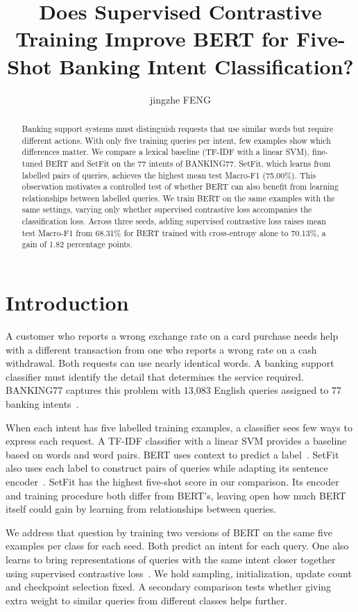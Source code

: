 \documentclass[runningheads]{llncs}
\title{Does Supervised Contrastive Training Improve BERT for Five-Shot Banking Intent Classification?}
\author{jingzhe FENG}
\institute{City University of Hong Kong (Dongguan)\\Student ID: 72655564}
\begin{document}
\maketitle
\begin{abstract}
Banking support systems must distinguish requests that use similar words but require different actions. With only five training queries per intent, few examples show which differences matter. We compare a lexical baseline (TF-IDF with a linear SVM), fine-tuned BERT and SetFit on the 77 intents of BANKING77. SetFit, which learns from labelled pairs of queries, achieves the highest mean test Macro-F1 (75.00\%). This observation motivates a controlled test of whether BERT can also benefit from learning relationships between labelled queries. We train BERT on the same examples with the same settings, varying only whether supervised contrastive loss accompanies the classification loss. Across three seeds, adding supervised contrastive loss raises mean test Macro-F1 from 68.31\% for BERT trained with cross-entropy alone to 70.13\%, a gain of 1.82 percentage points.
\end{abstract}

\section{Introduction}
A customer who reports a wrong exchange rate on a card purchase needs help with a different transaction from one who reports a wrong rate on a cash withdrawal. Both requests can use nearly identical words. A banking support classifier must identify the detail that determines the service required. BANKING77 captures this problem with 13,083 English queries assigned to 77 banking intents~\cite{banking}.

When each intent has five labelled training examples, a classifier sees few ways to express each request. A TF-IDF classifier with a linear SVM provides a baseline based on words and word pairs. BERT uses context to predict a label~\cite{bert}. SetFit also uses each label to construct pairs of queries while adapting its sentence encoder~\cite{setfit}. SetFit has the highest five-shot score in our comparison. Its encoder and training procedure both differ from BERT's, leaving open how much BERT itself could gain by learning from relationships between queries.

We address that question by training two versions of BERT on the same five examples per class for each seed. Both predict an intent for each query. One also learns to bring representations of queries with the same intent closer together using supervised contrastive loss~\cite{supcon,gunel}. We hold sampling, initialization, update count and checkpoint selection fixed. A secondary comparison tests whether giving extra weight to similar queries from different classes helps further.
\end{document}
